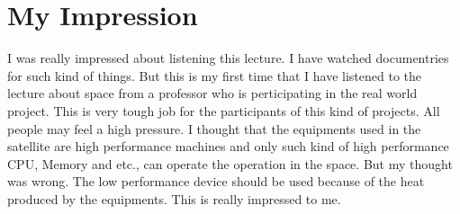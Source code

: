 \section*{My Impression}
I was really impressed about listening this lecture. I have watched documentries for such kind of things. But this is my first time that I have listened to the lecture about space from a professor who is perticipating in the real world project. This is very tough job for the participants of this kind of projects. All people may feel a high pressure. I thought that the equipments used in the satellite are high performance machines and only such kind of high performance CPU, Memory and etc., can operate the operation in the space. But my thought was wrong. The low performance device should be used because of the heat produced by the equipments. This is really impressed to me.